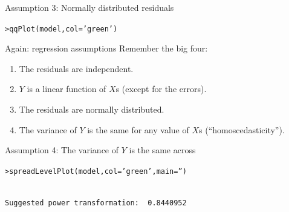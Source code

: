 \documentclass{beamer}\usepackage[]{graphicx}\usepackage[]{color}
\makeatletter
\newcommand{\hlstr}[1]{\textcolor[rgb]{1,0.894,0.71}{#1}}%
\newcommand{\hlstd}[1]{\textcolor[rgb]{1,0.894,0.769}{#1}}%
\newcommand{\hlkwc}[1]{\textcolor[rgb]{0.78,0.941,0.545}{#1}}%
\newcommand{\hlkwd}[1]{\textcolor[rgb]{1,0.78,0.769}{#1}}%
\newenvironment{kframe}{%
 \def\at@end@of@kframe{}%
 \ifinner\ifhmode%
  \def\at@end@of@kframe{\end{minipage}}%
  \begin{minipage}{\columnwidth}%
 \fi\fi%
 \def\FrameCommand##1{\hskip\@totalleftmargin \hskip-\fboxsep
 \colorbox{shadecolor}{##1}\hskip-\fboxsep
     \hskip-\linewidth \hskip-\@totalleftmargin \hskip\columnwidth}%
 \MakeFramed {\advance\hsize-\width
   \@totalleftmargin\z@ \linewidth\hsize
   \@setminipage}}%
 {\par\unskip\endMakeFramed%
 \at@end@of@kframe}
\newenvironment{knitrout}{}{} %
\makeatother
\begin{document}
\begin{darkframes}
\begin{frame}[fragile]{Assumption 3: Normally distributed residuals}
\begin{knitrout}
\begin{kframe}
\begin{alltt}
\hlstd{> }\hlkwd{qqPlot}\hlstd{(model,} \hlkwc{col}\hlstd{=}\hlstr{'green'}\hlstd{)}
\end{alltt}
\end{kframe}


\end{knitrout}
    \end{frame}
    
    
    \begin{frame}{Again: regression assumptions}
      Remember the big four:
      \begin{enumerate}
        \item The residuals are independent.
        \item $Y$ is a linear function of $X$s (except for the errors).
        \item The residuals are normally distributed.
        \item \alert{The variance of $Y$ is the same for any value of $X$s (``homoscedasticity'').}
      \end{enumerate}
    \end{frame}
    
    
    \begin{frame}[fragile]{Assumption 4: The variance of $Y$ is the same across}
    
\begin{knitrout}
\begin{kframe}
\begin{alltt}
\hlstd{> }\hlkwd{spreadLevelPlot}\hlstd{(model,} \hlkwc{col}\hlstd{=}\hlstr{'green'}\hlstd{,} \hlkwc{main}\hlstd{=}\hlstr{''}\hlstd{)}
\end{alltt}
\end{kframe}

\begin{kframe}\begin{verbatim}

Suggested power transformation:  0.8440952 
\end{verbatim}
\end{kframe}
\end{knitrout}
    \end{frame}
    
    
    

\end{darkframes}
\end{document}

